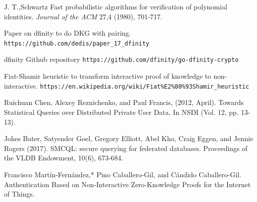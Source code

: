 \documentclass{article}
\begin{document}
\begin{thebibliography}{9}
J. T.,Schwartz Fast probabilistic algorithms for verification of polynomial identities. \textit{Journal of the ACM} 27,4 (1980), 701-717.


Paper on dfinity to do DKG with pairing.
\texttt{https://github.com/dedis/paper\_17\_dfinity}

dfinity Github repository
\texttt{https://github.com/dfinity/go-dfinity-crypto}

Fiat-Shamir heuristic to transform interactive proof of knowledge to non-interactive.
\texttt{https://en.wikipedia.org/wiki/Fiat\%E2\%80\%93Shamir\_heuristic}

Ruichuan Chen, Alexey Reznichenko, and Paul Francis, (2012, April). Towards Statistical Queries over Distributed Private User Data. In NSDI (Vol. 12, pp. 13-13).


Johes Bater, Satyender Goel, Gregory Elliott, Abel Kho, Craig Eggen, and Jennie Rogers (2017). SMCQL: secure querying for federated databases. Proceedings of the VLDB Endowment, 10(6), 673-684.

Francisco Martín-Fernández,* Pino Caballero-Gil, and Cándido Caballero-Gil. Authentication Based on Non-Interactive Zero-Knowledge Proofs for the Internet of Things.

\end{thebibliography}
\end{document}
